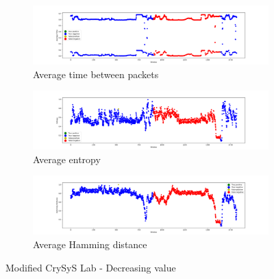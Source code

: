 \begin{figure}
    \centering
    \begin{subfigure}[b]{\linewidth}
        \includegraphics[width = \linewidth]{img/parts/app/tests/crysys/decr/AvgTime.png}
        \caption{Average time between packets}
        \label{subfig:extract_crysys_decr_avgtime}
    \end{subfigure}
    \begin{subfigure}[b]{\linewidth}
        \includegraphics[width = \linewidth]{img/parts/app/tests/crysys/decr/Entropy.png}
        \caption{Average entropy}
        \label{subfig:extract_crysys_decr_entropy}
    \end{subfigure}
    \begin{subfigure}[b]{\linewidth}
        \includegraphics[width = \linewidth]{img/parts/app/tests/crysys/decr/HammingDist.png}
        \caption{Average Hamming distance}
        \label{subfig:extract_crysys_decr_hammingdist}
    \end{subfigure}
    \caption{Modified CrySyS Lab - Decreasing value}
    \label{fig:extract_crysys_decr}
\end{figure}

